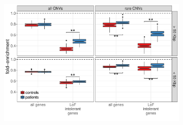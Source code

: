 \begin{figure}[htp]
  \centering
  \begin{subfigure}[b]{.7\textwidth}
    \includegraphics[width=\linewidth,page=3]{figures/epilepsy-enrichmentPatterns.pdf}
    \caption{}
    \label{fig:epiexpriv}
  \end{subfigure}


\end{figure}
